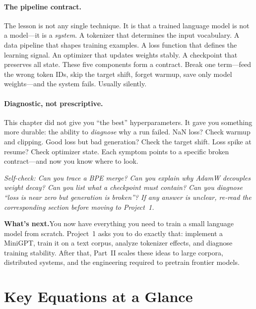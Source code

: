 \paragraph{The pipeline contract.} The lesson is not any single technique. It is that a trained language model is not a model---it is a \emph{system}. A tokenizer that determines the input vocabulary. A data pipeline that shapes training examples. A loss function that defines the learning signal. An optimizer that updates weights stably. A checkpoint that preserves all state. These five components form a contract. Break one term---feed the wrong token IDs, skip the target shift, forget warmup, save only model weights---and the system fails. Usually silently.

\paragraph{Diagnostic, not prescriptive.} This chapter did not give you ``the best'' hyperparameters. It gave you something more durable: the ability to \emph{diagnose} why a run failed. NaN loss? Check warmup and clipping. Good loss but bad generation? Check the target shift. Loss spike at resume? Check optimizer state. Each symptom points to a specific broken contract---and now you know where to look.

\medskip
\noindent\textit{Self-check: Can you trace a BPE merge? Can you explain why AdamW decouples weight decay? Can you list what a checkpoint must contain? Can you diagnose ``loss is near zero but generation is broken''? If any answer is unclear, re-read the corresponding section before moving to Project~1.}

\medskip
\noindent\textbf{What's next.}\quad You now have everything you need to train a small language model from scratch. Project~1 asks you to do exactly that: implement a MiniGPT, train it on a text corpus, analyze tokenizer effects, and diagnose training stability. After that, Part~II scales these ideas to large corpora, distributed systems, and the engineering required to pretrain frontier models.


\section*{Key Equations at a Glance}

